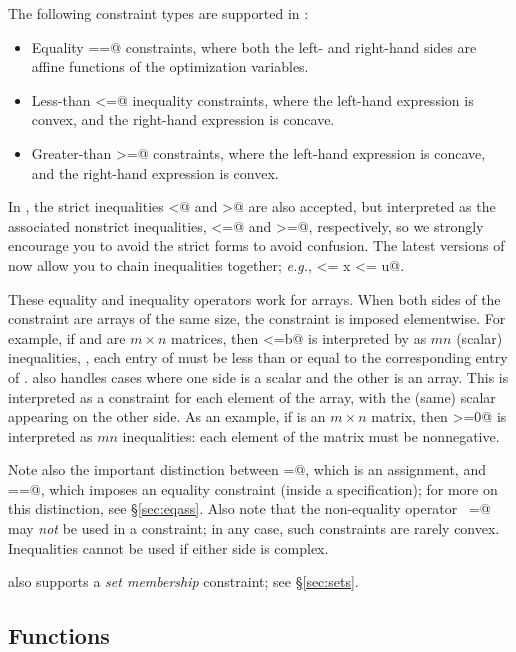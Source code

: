 \documentclass[12pt]{article}
\begin{document}
The following constraint types are supported in \cvx:
\begin{itemize}
\item Equality \verb@==@ constraints, where both the left- and right-hand
sides are affine functions of the optimization variables.
\item Less-than \verb@<=@ inequality constraints, where the left-hand
expression is convex, and the right-hand expression is concave.
\item Greater-than \verb@>=@ constraints, where the left-hand
expression is concave, and the right-hand expression is convex.
\end{itemize}
In \cvx, the strict inequalities \verb@<@ and \verb@>@ are also accepted,
but interpreted as the associated nonstrict inequalities, \verb@<=@
and \verb@>=@, respectively, so we strongly encourage you to avoid the
strict forms to avoid confusion. The latest versions of \cvx now allow you to
chain inequalities together; \emph{e.g.}, \verb@l <= x <= u@.

These equality and inequality operators work for arrays.
When both sides of the constraint are arrays of the same size,
the constraint is imposed elementwise. For example, if \verb@a@ and \verb@b@
are $m \times n$ matrices, then \verb@a<=b@
is interpreted by \cvx as $mn$ (scalar) inequalities, \ie,
each entry of \verb@a@ must be less than or equal to
the corresponding entry of \verb@b@.
\cvx also handles cases where one side is 
a scalar and the other is an array.  This is interpreted as a
constraint for each element of the array, with the (same) scalar
appearing on the other side.
As an example, if \verb@a@ is an $m\times n$ matrix, then \verb@a>=0@ 
is interpreted as $mn$ inequalities: each element of the matrix
must be nonnegative.

Note also the important distinction between \verb@=@, which is an 
assignment, and \verb@==@, which imposes an equality constraint
(inside a \cvx specification); for more on this distinction,
see \S\ref{sec:eqass}.
Also note that the non-equality operator \verb@~=@ may \emph{not}
be used in a constraint; in any case, such constraints are 
rarely convex.
Inequalities cannot be used if either side is complex.

\cvx also supports a \emph{set membership} constraint; 
see \S\ref{sec:sets}.

\subsection{Functions}
\end{document}
